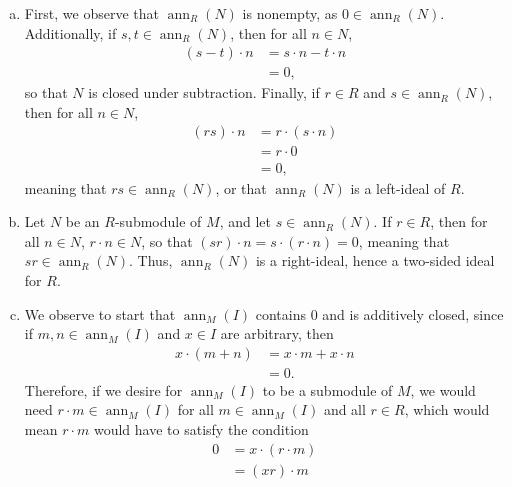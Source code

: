 \documentclass[10pt]{mypackage}
\begin{document}
\begin{solution}\hfill
  \begin{enumerate}[(a)]
    \item First, we observe that $\operatorname{ann}_R(N)$ is nonempty, as $0\in \operatorname{ann}_R(N)$. Additionally, if $s,t\in \operatorname{ann}_R(N)$, then for all $n\in N$,
      \begin{align*}
        \left( s-t \right)\cdot n &= s\cdot n - t\cdot n\\
                                  &= 0,
      \end{align*}
      so that $N$ is closed under subtraction. Finally, if $r\in R$ and $s\in \operatorname{ann}_R\left( N \right)$, then for all $n\in N$,
      \begin{align*}
        \left( rs \right)\cdot n &= r\cdot \left( s\cdot n \right)\\
                                 &= r\cdot 0\\
                                 &= 0,
      \end{align*}
      meaning that $rs\in \operatorname{ann}_R\left( N \right)$, or that $\operatorname{ann}_R\left( N \right)$ is a left-ideal of $R$.
    \item Let $N$ be an $R$-submodule of $M$, and let $s\in \operatorname{ann}_R\left( N \right)$. If $r\in R$, then for all $n\in N$, $r\cdot n\in N$, so that $\left( sr \right)\cdot n = s\cdot \left( r\cdot n \right) = 0$, meaning that $sr\in \operatorname{ann}_R\left( N \right)$. Thus, $\operatorname{ann}_R\left( N \right)$ is a right-ideal, hence a two-sided ideal for $R$.
    \item We observe to start that $\operatorname{ann}_M(I)$ contains $0$ and is additively closed, since if $m,n\in \operatorname{ann}_M\left( I \right)$ and $x\in I$ are arbitrary, then
      \begin{align*}
        x\cdot \left( m + n \right) &= x\cdot m + x\cdot n\\
                                    &= 0.
      \end{align*}
      Therefore, if we desire for $\operatorname{ann}_M(I)$ to be a submodule of $M$, we would need $r\cdot m\in \operatorname{ann}_M(I)$ for all $m\in \operatorname{ann}_M(I)$ and all $r\in R$, which would mean $r\cdot m$ would have to satisfy the condition
      \begin{align*}
        0 &= x\cdot \left( r\cdot m \right)\\
          &= \left( xr \right)\cdot m
      \end{align*}

\end{enumerate}
\end{solution}
\end{document}
